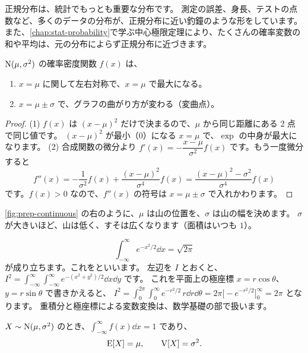 正規分布は、統計でもっとも重要な分布です。
測定の誤差、身長、テストの点数など、多くのデータの分布が、正規分布に近い釣鐘のような形をしています。
また、\cref{chap:stat-probability}で学ぶ中心極限定理により、たくさんの確率変数の和や平均は、元の分布によらず正規分布に近づきます。

\begin{proposition}
  $\mathrm{N}(\mu, \sigma^2)$ の確率密度関数 $f(x)$ は、
  \begin{enumerate}
    \item $x = \mu$ に関して左右対称で、$x = \mu$ で最大になる。
    \item $x = \mu \pm \sigma$ で、グラフの曲がり方が変わる（変曲点）。
  \end{enumerate}
\end{proposition}

\begin{proof}
  (1) $f(x)$ は $(x - \mu)^2$ だけで決まるので、$\mu$ から同じ距離にある 2 点で同じ値です。
  $(x - \mu)^2$ が最小（$0$）になる $x = \mu$ で、$\exp$ の中身が最大になります。
  (2) 合成関数の微分より $f'(x) = -\dfrac{x - \mu}{\sigma^2} f(x)$ です。もう一度微分すると
  \[
    f''(x) = -\frac{1}{\sigma^2} f(x) + \frac{(x - \mu)^2}{\sigma^4} f(x) = \frac{(x - \mu)^2 - \sigma^2}{\sigma^4} f(x)
  \]
  です。$f(x) > 0$ なので、$f''(x)$ の符号は $x = \mu \pm \sigma$ で入れかわります。
\end{proof}

\cref{fig:prep-continuous} の右のように、$\mu$ は山の位置を、$\sigma$ は山の幅を決めます。
$\sigma$ が大きいほど、山は低く、すそは広くなります（面積はいつも $1$）。

\begin{mathnote}[ガウス積分]
  \[
    \int_{-\infty}^{\infty} e^{-x^2/2} \dd x = \sqrt{2\pi}
  \]
  が成り立ちます。これをといいます。
  左辺を $I$ とおくと、$I^2 = \int_{-\infty}^{\infty}\int_{-\infty}^{\infty} e^{-(x^2+y^2)/2} \dd x \dd y$ です。
  これを平面上の極座標 $x = r\cos\theta$、$y = r\sin\theta$ で書きかえると、
  $I^2 = \int_0^{2\pi}\int_0^{\infty} e^{-r^2/2}\, r \dd r \dd\theta = 2\pi \bigl[-e^{-r^2/2}\bigr]_0^\infty = 2\pi$ となります。
  重積分と極座標による変数変換は、数学基礎の部で扱います。
\end{mathnote}

\begin{theorem}
  $X \sim \mathrm{N}(\mu, \sigma^2)$ のとき、$\int_{-\infty}^{\infty} f(x) \dd x = 1$ であり、
  \[
    \mathrm{E}[X] = \mu, \qquad \mathrm{V}[X] = \sigma^2.
  \]
\end{theorem}

